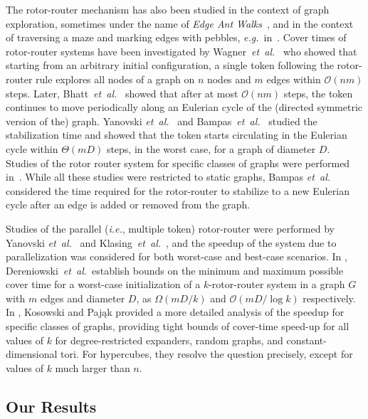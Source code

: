 \documentclass{article}[11pt,letter]
\newcommand{\bigo}{\mathcal{O}}
\newcommand{\ie}{{\it i.e.}\xspace}
\newcommand{\eg}{{\it e.g.}\xspace}
\newcommand{\etal}{{\it et~al.}}
\begin{document}
The rotor-router mechanism has also been studied in the context of graph exploration, sometimes under the name of {\em Edge Ant Walks\/}~\cite{Wagner99distributedcovering,YanovskiWB03}, and in the context of traversing a maze and marking edges with pebbles, \eg~in~\cite{BhattEGT02}. Cover times of rotor-router systems have been investigated by Wagner~\etal~\cite{Wagner99distributedcovering} who showed that starting from an arbitrary initial configuration\footnotemark[1], a single token following the rotor-router rule explores all nodes of a graph on $n$ nodes and $m$ edges within $\bigo(nm)$ steps. Later, Bhatt~\etal~\cite{BhattEGT02} showed that after at most $\bigo(nm)$ steps, the token continues to move periodically along an Eulerian cycle of the (directed symmetric version of the) graph. Yanovski \etal~\cite{YanovskiWB03} and Bampas~\etal~\cite{BHKKR09} studied the stabilization time and showed that the token starts circulating in the Eulerian cycle within $\Theta (mD)$ steps, in the worst case, for a graph of diameter $D$. Studies of the rotor router system for specific classes of graphs were performed in~\cite{FS10}. While all these studies were restricted to static graphs, Bampas \etal~\cite{BGKKR09}  considered the time required for the rotor-router to stabilize to a new Eulerian cycle after an edge is added or removed from the graph.

Studies of the parallel (\ie, multiple token) rotor-router were performed by Yanovski \etal~\cite{YanovskiWB03} and Klasing~\etal~\cite{DBLP:conf/podc/KlasingKPS13}, and the speedup of the system due to parallelization was considered for both worst-case and best-case scenarios.  In \cite{DereniowskiKPU14}, Dereniowski~\etal\ establish bounds on the minimum and maximum possible cover time for a worst-case initialization of a $k$-rotor-router system in a graph $G$ with $m$ edges and diameter $D$,  as  $\Omega(mD/k)$ and $\bigo(mD/\log k)$ respectively.  In \cite{KosowskiP14}, Kosowski and Pająk provided a more detailed analysis of the speedup for specific classes of graphs, providing tight bounds of cover-time speed-up for all values of $k$ for degree-restricted expanders, random graphs, and constant-dimensional tori. For hypercubes, they resolve the question precisely, except for values of $k$ much larger than $n$.



\subsection{Our Results}
\end{document}
